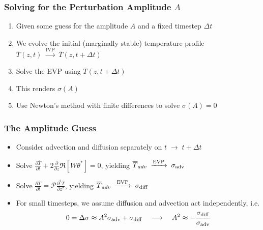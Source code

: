 \begin{frame}[fragile]
    \frametitle{Solving for the Perturbation Amplitude $A$}
    \begin{enumerate}
        \item Given some guess for the amplitude $A$ and a fixed timestep $\Delta t$\newline
        
        \item We evolve the initial (marginally stable) temperature profile $\overline{T}(z,t) \; \xrightarrow{\text{IVP}} \; \overline{T}(z,t+\Delta t)$\newline
        
        \item Solve the EVP using $\overline{T}(z,t+\Delta t)$\newline
        
        \item This renders $\sigma(A)$\newline
        
        \item Use Newton's method with finite differences to solve $\sigma(A) = 0$
    \end{enumerate}
    
\end{frame}

\begin{frame}[fragile]
    \frametitle{The Amplitude Guess}
    \begin{itemize}
        \item Consider advection and diffusion separately on $t\;\to\; t+\Delta t$\newline
        
        \item Solve $\frac{\partial\overline{T}}{\partial t} + 2\frac{\partial}{\partial z} \Re\left[ W \theta^* \right] = 0$, yielding $\overline{T}_{adv} \; \xrightarrow{\text{EVP}} \; \sigma_{\rm{adv}}$\newline
        
        \item Solve $\frac{\partial\overline{T}}{\partial t} = \mathcal{P}\frac{\partial^2 \overline{T}}{\partial z^2}$, yielding $\overline{T}_{adv} \; \xrightarrow{\text{EVP}} \; \sigma_{\rm{diff}}$\newline
        
        \item For small timesteps, we assume diffusion and advection act independently, i.e.
        \begin{equation}
            0 = \Delta \sigma \approx A^2\sigma_{\rm{adv}} + \sigma_{\rm{diff}} \quad \longrightarrow \quad A^2 \approx -\frac{\sigma_{\rm{diff}}}{\sigma_{\rm{adv}}}
        \end{equation}
    
    \end{itemize}
    
\end{frame}

